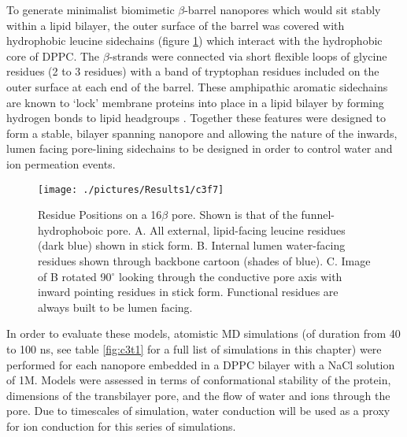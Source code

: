 To generate minimalist biomimetic $\beta$-barrel nanopores which would sit stably within a lipid bilayer, the outer surface of the barrel was covered with hydrophobic leucine sidechains (figure \ref{fig:c3f7}) which interact with the hydrophobic core of DPPC. The $\beta$-strands were connected via short flexible loops of glycine residues (2 to 3 residues) with a band of tryptophan residues included on the outer surface at each end of the barrel. These amphipathic aromatic sidechains are known to ‘lock’ membrane proteins into place in a lipid bilayer by forming hydrogen bonds to lipid headgroups \cite{Killian1998,Stansfeld2013a}. Together these features were designed to form a stable, bilayer spanning nanopore and allowing the nature of the inwards, lumen facing pore-lining sidechains to be designed in order to control water and ion permeation events.

\begin{figure}[H]
\begin{center}
\texttt{[image: ./pictures/Results1/c3f7]}
\caption[Residue positions on a 16$\beta$ pore.] {Residue Positions on a 16$\beta$ pore. Shown is that of the funnel-hydrophoboic pore. A. All external, lipid-facing leucine residues (dark blue) shown in stick form.  B. Internal lumen water-facing residues shown through backbone cartoon (shades of blue). C. Image of B rotated 90$^{\circ}$ looking through the conductive pore axis with inward pointing residues in stick form. Functional residues are always built to be lumen facing.}
\label{fig:c3f7}
\end{center}
\end{figure}

In order to evaluate these models, atomistic MD simulations (of duration from 40 to 100 ns, see table \ref{fig:c3t1} for a full list of simulations in this chapter) were performed for each nanopore embedded in a DPPC bilayer with a NaCl solution of 1M. Models were assessed in terms of conformational stability of the protein, dimensions of the transbilayer pore, and the flow of water and ions through the pore. Due to timescales of simulation, water conduction will be used as a proxy for ion conduction for this series of simulations. 

